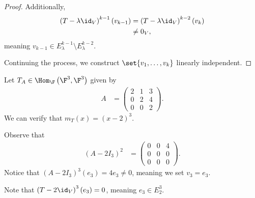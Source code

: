 \documentclass[10pt]{mypackage}
\begin{document}
\begin{proof}
  Additionally,
  \begin{align*}
    \left(T - \lambda \id_{V}\right)^{k-1}\left(v_{k-1}\right) &= \left(T -\lambda \id_V\right)^{k-2}\left(v_{k}\right)\\
                                                               &\neq 0_{V},
  \end{align*}
  meaning $v_{k-1}\in E_{\lambda}^{k-1}\setminus E_{\lambda}^{k-2}$.\newline

  Continuing the process, we construct $\set{v_1,\dots,v_k}$ linearly independent.
\end{proof}
\begin{example}
  Let $T_A\in \Hom_{\F}\left(\F^3,\F^3\right)$ given by
  \begin{align*}
    A &= \begin{pmatrix}2 & 1 & 3 \\ 0 & 2 & 4 \\ 0 & 0 & 2\end{pmatrix}.
  \end{align*}
  We can verify that $m_{T}\left(x\right) = \left(x-2\right)^3$.\newline

  Observe that
  \begin{align*}
    \left(A - 2 I_{3}\right)^2 &= \begin{pmatrix}0 & 0 & 4 \\ 0 & 0 & 0 \\ 0 & 0 & 0\end{pmatrix}.
  \end{align*}
  Notice that $\left(A - 2I_3\right)^{3}\left(e_3\right) = 4e_3\neq 0$, meaning we set $v_3 = e_3$.\newline

  Note that $\left(T - 2\id_V\right)^{3}\left(e_3\right) = 0$, meaning $e_3\in E_{2}^{3}$.\newline


\end{example}
\end{document}
